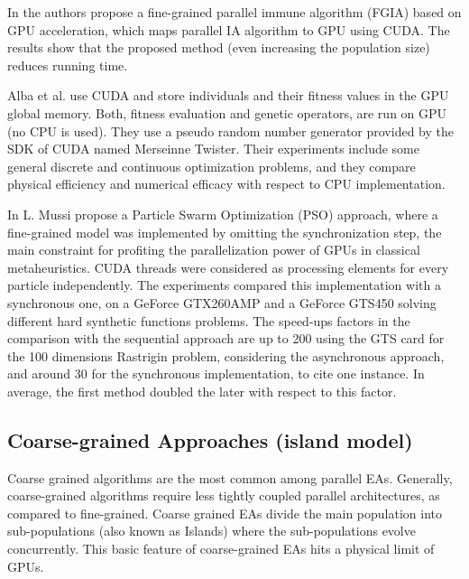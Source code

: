 \documentclass[prodmode,acmtecs]{acmsmall}
\begin{document}
In \cite{Li:2009:PIA:1726585.1726930} the authors propose a fine-grained parallel immune algorithm (FGIA) based on GPU acceleration, which maps parallel IA algorithm to GPU using CUDA. The results show that the proposed method (even increasing the population size) reduces running time.%

Alba et al. \cite{springerlink:10.1007978-3-642-12538-619} use CUDA and store individuals and their fitness values in the GPU global memory. Both, fitness evaluation and genetic operators, are run on GPU (no CPU is used). 
They use a pseudo random number generator provided by the SDK of CUDA named Merseinne Twister. Their experiments include some general discrete and continuous optimization problems, and they compare physical efficiency and numerical efficacy with respect to CPU implementation. 

In \cite{PSO-GPU_Mussi} L. Mussi propose a Particle Swarm Optimization (PSO) approach, where a fine-grained model was implemented by omitting the synchronization step, the main constraint for profiting the parallelization power of GPUs in classical metaheuristics. CUDA threads were considered as processing elements for every particle independently. The experiments compared this implementation with a synchronous one, on a GeForce GTX260AMP and a GeForce GTS450 solving different hard synthetic functions problems. The speed-ups factors in the comparison with the sequential approach are up to 200 using the GTS card for the 100 dimensions Rastrigin problem, considering the asynchronous approach, and around 30 for the synchronous implementation, to cite one instance. In average, the first method doubled the later with respect to this factor.

\subsection{Coarse-grained Approaches (island model)}

Coarse grained algorithms are the most common among parallel EAs. Generally, coarse-grained algorithms require less tightly coupled parallel architectures, as compared to fine-grained. Coarse grained EAs divide the main population into sub-populations (also known as Islands) where the sub-populations evolve concurrently. This basic feature of coarse-grained EAs hits a physical limit of GPUs. 
\end{document}
